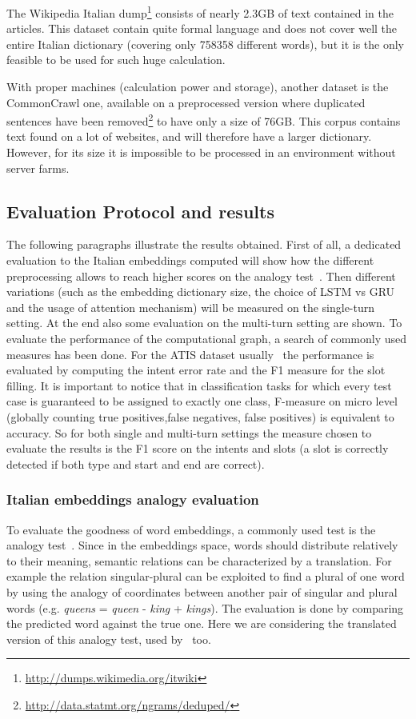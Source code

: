 The Wikipedia Italian dump\footnote{\url{http://dumps.wikimedia.org/itwiki}} consists of nearly 2.3GB of text contained in the articles. This dataset contain quite formal language and does not cover well the entire Italian dictionary (covering only 758358 different words), but it is the only feasible to be used for such huge calculation.

With proper machines (calculation power and storage), another dataset is the CommonCrawl one, available on a preprocessed version where duplicated sentences have been removed\footnote{\url{http://data.statmt.org/ngrams/deduped/}} to have only a size of 76GB. This corpus contains text found on a lot of websites, and will therefore have a larger dictionary. However, for its size it is impossible to be processed in an environment without server farms.

\subsection{Evaluation Protocol and results}
\label{validationMeasures}

The following paragraphs illustrate the results obtained. First of all, a dedicated evaluation to the Italian embeddings computed will show how the different preprocessing allows to reach higher scores on the analogy test~\cite{mikolov2013linguistic}. Then different variations (such as the embedding dictionary size, the choice of LSTM vs GRU and the usage of attention mechanism) will be measured on the single-turn setting. At the end also some evaluation on the multi-turn setting are shown. To evaluate the performance of the computational graph, a search of commonly used measures has been done. For the ATIS dataset usually~\cite{tur2010left} the performance is evaluated by computing the intent error rate and the F1 measure for the slot filling. It is important to notice that in classification tasks for which every test case is guaranteed to be assigned to exactly one class, F-measure on micro level (globally counting true positives,false negatives, false positives) is equivalent to accuracy. So for both single and multi-turn settings the measure chosen to evaluate the results is the F1 score on the intents and slots (a slot is correctly detected if both type and start and end are correct).

\subsubsection{Italian embeddings analogy evaluation}
To evaluate the goodness of word embeddings, a commonly used test is the analogy test~\cite{mikolov2013linguistic}. Since in the embeddings space, words should distribute relatively to their meaning, semantic relations can be characterized by a translation. For example the relation singular-plural can be exploited to find a plural of one word by using the analogy of coordinates between another pair of singular and plural words (e.g. \textit{queens} = \textit{queen} - \textit{king} + \textit{kings}). The evaluation is done by comparing the predicted word against the true one. Here we are considering the translated version of this analogy test, used by~\cite{berardi2015word} too.

